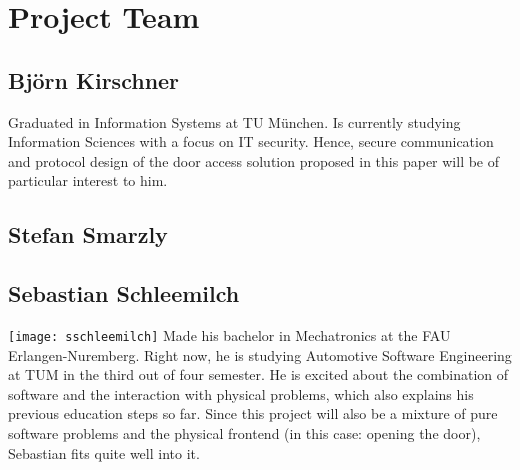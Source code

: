\section{Project Team}\label{sec:team}

\subsection{Björn Kirschner}
Graduated in Information Systems at TU München. Is currently studying Information Sciences with a focus on IT security. Hence, secure communication and protocol design of the door access solution proposed in this paper will be of particular interest to him.


\subsection{Stefan Smarzly}


\subsection{Sebastian Schleemilch}
\texttt{[image: sschleemilch]}
Made his bachelor in Mechatronics at the FAU Erlangen-Nuremberg. Right now, he is studying Automotive Software Engineering at TUM in the third out of four semester. He is excited about the combination of software and the interaction with physical problems, which also explains his previous education steps so far.
Since this project will also be a mixture of pure software problems and the physical frontend (in this case: opening the door), Sebastian fits quite well into it.

